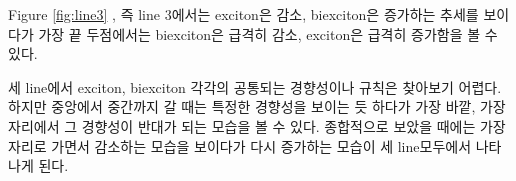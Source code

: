 
Figure \ref{fig:line3} , 즉 line 3에서는 exciton은 감소, biexciton은 증가하는 추세를 보이다가 가장 끝 두점에서는 biexciton은 급격히 감소, exciton은 급격히 증가함을 볼 수 있다.

세 line에서 exciton, biexciton 각각의 공통되는 경향성이나 규칙은 찾아보기 어렵다. 하지만 중앙에서 중간까지 갈 때는 특정한 경향성을 보이는 듯 하다가 가장 바깥, 가장자리에서 그 경향성이 반대가 되는 모습을 볼 수 있다. 종합적으로 보았을 때에는 가장자리로 가면서 감소하는 모습을 보이다가 다시 증가하는 모습이 세 line모두에서 나타나게 된다.


	